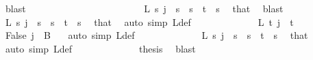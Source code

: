 \begin{isabellebody}
\ blast\isanewline
\isanewline
\ \ \ \ \ \ \ \ \ \ \isamarkupfalse%
\isanewline
\ \ \ \ \ \ \ \ \ \ \isamarkupfalse%
\ \isamarkupfalse%
\ {\isachardoublequoteopen}L\ s\ j\ {\isacharequal}{\kern0pt}\ s{\isachardoublequoteclose}\ \ {\isachardoublequoteopen}s\ {\isacharless}{\kern0pt}\ t{\isachardoublequoteclose}\ \ s\ \isamarkupfalse%
\ that\ \isamarkupfalse%
\ blast\isanewline
\ \ \ \ \ \ \ \ \ \ \isamarkupfalse%
\ \isamarkupfalse%
\ {\isachardoublequoteopen}L{\isacharprime}{\kern0pt}\ s\ j\ {\isacharequal}{\kern0pt}\ s{\isachardoublequoteclose}\ \ {\isachardoublequoteopen}s\ {\isacharless}{\kern0pt}\ t{\isachardoublequoteclose}\ \ s\ \isamarkupfalse%
\ that\ \isamarkupfalse%
\ {\isacharparenleft}{\kern0pt}auto\ simp{\isacharcolon}{\kern0pt}\ L{\isacharprime}{\kern0pt}{\isacharunderscore}{\kern0pt}def{\isacharparenright}{\kern0pt}\isanewline
\ \ \ \ \ \ \ \ \ \ \isamarkupfalse%
\ \isamarkupfalse%
\ {\isachardoublequoteopen}L{\isacharprime}{\kern0pt}\ t\ j\ {\isacharequal}{\kern0pt}\ t{\isachardoublequoteclose}\ \isamarkupfalse%
\ False\ {\isacartoucheopen}j\ {\isasymin}\ B\ {}{\isacartoucheclose}\ \isamarkupfalse%
\ {\isacharparenleft}{\kern0pt}auto\ simp{\isacharcolon}{\kern0pt}\ L{\isacharprime}{\kern0pt}{\isacharunderscore}{\kern0pt}def{\isacharparenright}{\kern0pt}\isanewline
\ \ \ \ \ \ \ \ \ \ \isamarkupfalse%
\ \isamarkupfalse%
\ {\isachardoublequoteopen}L{\isacharprime}{\kern0pt}\ s\ j\ {\isacharequal}{\kern0pt}\ s{\isachardoublequoteclose}\ \ {\isachardoublequoteopen}s\ {\isacharless}{\kern0pt}\ t{\isacharplus}{\kern0pt}{}{\isachardoublequoteclose}\ \ s\ \isamarkupfalse%
\ that\ \isamarkupfalse%
\ {\isacharparenleft}{\kern0pt}auto\ simp{\isacharcolon}{\kern0pt}\ L{\isacharprime}{\kern0pt}{\isacharunderscore}{\kern0pt}def{\isacharparenright}{\kern0pt}\isanewline
\ \ \ \ \ \ \ \ \ \ \isamarkupfalse%
\ \isamarkupfalse%
\ {\isacharquery}{\kern0pt}thesis\ \isamarkupfalse%
\ blast\isanewline
\ \ \ \ \ \ \ \ \isamarkupfalse%
\isanewline
\isanewline
\isanewline
\isanewline
\isanewline
\ \ \ \ \ \ \isamarkupfalse%
\isanewline
\ \ \ \ \ \ \isamarkupfalse%

\end{isabellebody}
